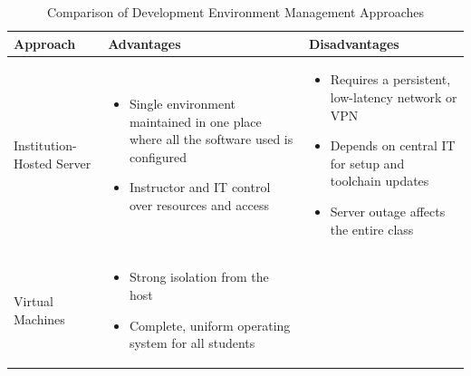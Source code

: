\begin{table}[htbp]
    \centering
    \caption{Comparison of Development Environment Management Approaches}
    \label{tab:env-comparison} \small
    \renewcommand{\arraystretch}{1.2}
    \begin{tabularx}
        {\textwidth}{@{}l >{\RaggedRight\arraybackslash}X >{\RaggedRight\arraybackslash}X@{}}
        \toprule \textbf{Approach} & \textbf{Advantages} & \textbf{Disadvantages}
        \\ \midrule Institution-Hosted Server &
        \vspace{-0.5\baselineskip}
        \begin{itemize}
            \item Single environment maintained in one place where all the software
                used is configured~\cite{valstarUsingDevContainersStandardize2020}

            \item Instructor and IT control over resources and access
        \end{itemize}
        \vspace{-0.5\baselineskip}
        &
        \vspace{-0.5\baselineskip}
        \begin{itemize}
            \item Requires a persistent, low-latency network or VPN~\cite{valstarUsingDevContainersStandardize2020}

            \item Depends on central IT for setup and toolchain updates~\cite{valstarUsingDevContainersStandardize2020,malanContainerizingCS50Standardizing2024}

            \item Server outage affects the entire class~\cite{malanContainerizingCS50Standardizing2024}
        \end{itemize}
        \vspace{-0.5\baselineskip}
        \\ \midrule Virtual Machines &
        \vspace{-0.5\baselineskip}
        \begin{itemize}
            \item Strong isolation from the host~\cite{stokerUsingVirtualMachines2013,harvieUsingVirtualMachines2019}

            \item Complete, uniform operating system for all students~\cite{stokerUsingVirtualMachines2013}


\end{itemize}
\end{tabularx}
\end{table}
